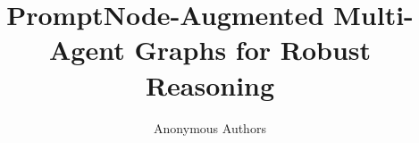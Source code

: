 \documentclass[11pt]{article}
\title{PromptNode-Augmented Multi-Agent Graphs for Robust Reasoning}
\author{Anonymous Authors}
\date{}
\begin{document}
\maketitle

\begin{abstract}

\end{abstract}










\appendix




\end{document}
